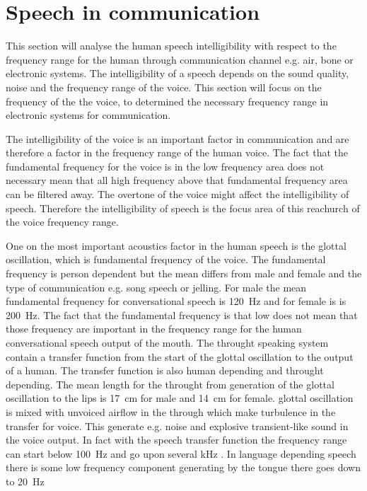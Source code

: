 \section{Speech in communication}

This section will analyse the human speech intelligibility with respect to the frequency range for the human through communication channel e.g. air, bone or electronic systems. The intelligibility of a speech depends on the sound quality, noise and the frequency range of the voice. This section will focus on the frequency of the the voice, to determined the necessary frequency range in electronic systems for communication. 

The intelligibility of the voice is an important factor in communication and are therefore a factor in the frequency range of the human voice. The fact that the fundamental frequency for the voice is in the low frequency area does not necessary mean that all high frequency above that fundamental frequency area can be filtered away. The overtone of the voice might affect the intelligibility of speech. Therefore the intelligibility of speech is the focus area of this reachurch of the voice frequency range. 

One on the most important acoustics factor in the human speech is the glottal oscillation, which is fundamental frequency of the voice. The fundamental frequency is person dependent but the mean differs from male and female and the type of communication e.g. song speech or jelling. For male the mean fundamental frequency for conversational speech is \SI{120}{\hertz} and for female is is \SI{200}{\hertz}. The fact that the fundamental frequency is that low does not mean that those frequency are important in the frequency range for the human conversational speech output of the mouth. The throught speaking system contain a transfer function from the start of the glottal oscillation to the output of a human. The transfer function is also human depending and throught depending. The mean length for the throught from generation of the glottal oscillation to the lips is \SI{17}{\centi\meter} for male and \SI{14}{\centi\meter} for female. glottal oscillation is mixed with unvoiced airflow in the through which make turbulence in the transfer for voice. This generate e.g. noise and explosive transient-like sound in the voice output. In fact with the speech transfer function the frequency range can start below \SI{100}{\hertz} and go upon several \si{\kilo\hertz} . In language depending speech there is some low frequency component generating by the tongue there goes down to \SI{20}{\hertz}

